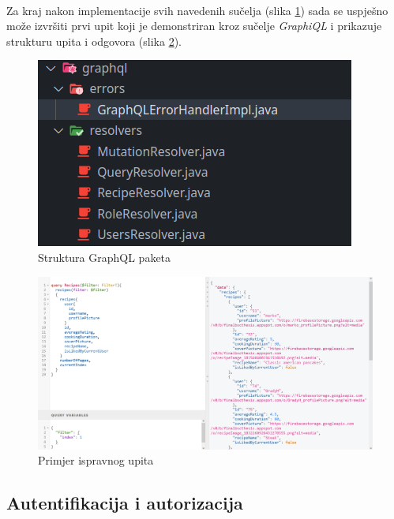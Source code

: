 \documentclass[times, utf8, zavrsni]{fer}
\begin{document}
\\
Za kraj nakon implementacije svih navedenih sučelja (slika \ref{fig:GraphQL implementation}) sada se
uspješno može izvršiti prvi upit koji je demonstriran kroz sučelje \textit{GraphiQL} i
prikazuje strukturu upita i odgovora (slika \ref{fig:GraphQL query}).
\begin{figure}[h]
      \centering
      \includegraphics[width=.5\textwidth]{graphql_implementation_classes.png}
      \caption{Struktura GraphQL paketa}
      \label{fig:GraphQL implementation}
\end{figure}
\begin{figure}[h]
      \centering
      \includegraphics[width=\textwidth]{graphql_query.png}
      \caption{Primjer ispravnog upita}
      \label{fig:GraphQL query}
\end{figure}


\subsection{Autentifikacija i autorizacija}
\end{document}

